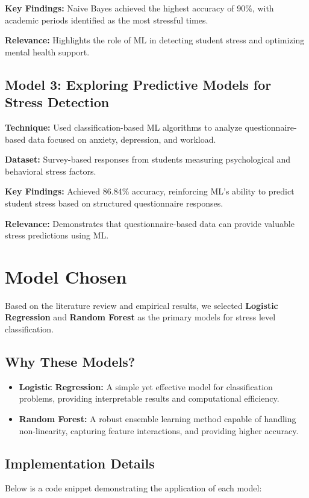 \documentclass[a4paper,11pt]{article}
\begin{document}
\noindent \textbf{Key Findings:} Naive Bayes achieved the highest accuracy of 90\%, with academic periods identified as the most stressful times.

\noindent \textbf{Relevance:} Highlights the role of ML in detecting student stress and optimizing mental health support.

\subsection{Model 3: Exploring Predictive Models for Stress Detection}

\noindent \textbf{Technique:} Used classification-based ML algorithms to analyze questionnaire-based data focused on anxiety, depression, and workload.

\noindent \textbf{Dataset:} Survey-based responses from students measuring psychological and behavioral stress factors.

\noindent \textbf{Key Findings:} Achieved 86.84\% accuracy, reinforcing ML’s ability to predict student stress based on structured questionnaire responses.

\noindent \textbf{Relevance:} Demonstrates that questionnaire-based data can provide valuable stress predictions using ML.

\section{Model Chosen}
Based on the literature review and empirical results, we selected \textbf{Logistic Regression} and \textbf{Random Forest} as the primary models for stress level classification.

\subsection{Why These Models?}
\begin{itemize}
    \item \textbf{Logistic Regression:} A simple yet effective model for classification problems, providing interpretable results and computational efficiency.
    \item \textbf{Random Forest:} A robust ensemble learning method capable of handling non-linearity, capturing feature interactions, and providing higher accuracy.
\end{itemize}

\subsection{Implementation Details}
Below is a code snippet demonstrating the application of each model:
\end{document}
